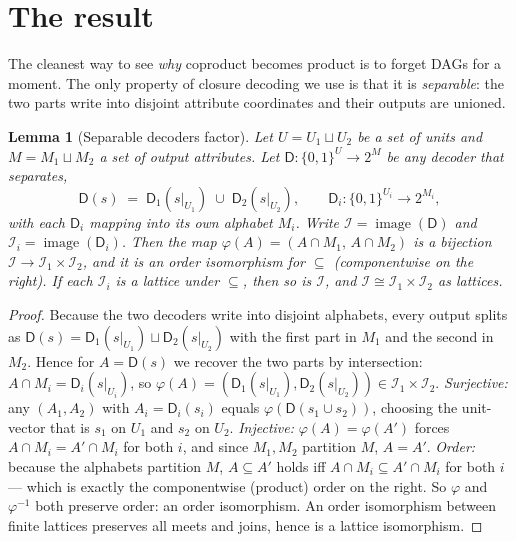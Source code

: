 \documentclass[11pt]{article}
\theoremstyle{definition}
\theoremstyle{plain}
\newtheorem{lemma}{Lemma}
\theoremstyle{remark}
\newcommand{\Dcode}{\mathsf{D}}            %
\newcommand{\attrs}{M}
\begin{document}
\section{The result}
\label{sec:result}

The cleanest way to see \emph{why} coproduct becomes product is to forget DAGs
for a moment. The only property of closure decoding we use is that it is
\emph{separable}: the two parts write into disjoint attribute coordinates and
their outputs are unioned.

\begin{lemma}[Separable decoders factor]
\label{lem:separable}
Let $U=U_1\sqcup U_2$ be a set of units and $\attrs=\attrs_1\sqcup\attrs_2$ a set
of output attributes. Let $\Dcode:\{0,1\}^U\to 2^{\attrs}$ be any decoder that
\emph{separates},
\[
  \Dcode(s)\;=\;\Dcode_1\!\left(s|_{U_1}\right)\;\cup\;\Dcode_2\!\left(s|_{U_2}\right),
  \qquad \Dcode_i:\{0,1\}^{U_i}\to 2^{\attrs_i},
\]
with each $\Dcode_i$ mapping into its own alphabet $\attrs_i$. Write
$\mathcal{I}=\operatorname{image}(\Dcode)$ and $\mathcal{I}_i=\operatorname{image}(\Dcode_i)$.
Then the map $\varphi(A)=(A\cap\attrs_1,\,A\cap\attrs_2)$ is a bijection
$\mathcal{I}\to\mathcal{I}_1\times\mathcal{I}_2$, and it is an order isomorphism
for $\subseteq$ (componentwise on the right). If each $\mathcal{I}_i$ is a
lattice under $\subseteq$, then so is $\mathcal{I}$, and
$\mathcal{I}\cong\mathcal{I}_1\times\mathcal{I}_2$ as lattices.
\end{lemma}

\begin{proof}
Because the two decoders write into disjoint alphabets, every output splits as
$\Dcode(s)=\Dcode_1(s|_{U_1})\sqcup\Dcode_2(s|_{U_2})$ with the first part in
$\attrs_1$ and the second in $\attrs_2$. Hence for $A=\Dcode(s)$ we recover the
two parts by intersection: $A\cap\attrs_i=\Dcode_i(s|_{U_i})$, so
$\varphi(A)=(\Dcode_1(s|_{U_1}),\Dcode_2(s|_{U_2}))\in\mathcal{I}_1\times\mathcal{I}_2$.
\emph{Surjective:} any $(A_1,A_2)$ with $A_i=\Dcode_i(s_i)$ equals
$\varphi(\Dcode(s_1\!\cup\!s_2))$, choosing the unit-vector that is $s_1$ on
$U_1$ and $s_2$ on $U_2$. \emph{Injective:} $\varphi(A)=\varphi(A')$ forces
$A\cap\attrs_i=A'\cap\attrs_i$ for both $i$, and since $\attrs_1,\attrs_2$
partition $\attrs$, $A=A'$. \emph{Order:} because the alphabets partition
$\attrs$, $A\subseteq A'$ holds iff $A\cap\attrs_i\subseteq A'\cap\attrs_i$ for
both $i$ --- which is exactly the componentwise (product) order on the right. So
$\varphi$ and $\varphi^{-1}$ both preserve order: an order isomorphism. An order
isomorphism between finite lattices preserves all meets and joins, hence is a
lattice isomorphism.
\end{proof}
\end{document}
